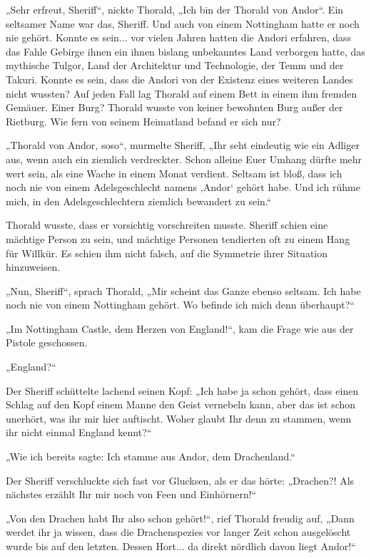 \documentclass[10pt, a4paper, oneside]{book}
\begin{document}
„Sehr erfreut, Sheriff“, nickte Thorald, „Ich bin der Thorald von Andor“. Ein seltsamer Name war das, Sheriff. Und auch von einem Nottingham hatte er noch nie gehört. Konnte es sein... vor vielen Jahren hatten die Andori erfahren, dass das Fahle Gebirge ihnen ein ihnen bislang unbekanntes Land verborgen hatte, das mythische Tulgor, Land der Architektur und Technologie, der Temm und der Takuri. Konnte es sein, dass die Andori von der Existenz eines weiteren Landes nicht wussten? Auf jeden Fall lag Thorald auf einem Bett in einem ihm fremden Gemäuer. Einer Burg? Thorald wusste von keiner bewohnten Burg außer der Rietburg. Wie fern von seinem Heimatland befand er sich nur?

„Thorald von Andor, soso“, murmelte Sheriff, „Ihr seht eindeutig wie ein Adliger aus, wenn auch ein ziemlich verdreckter. Schon alleine Euer Umhang dürfte mehr wert sein, als eine Wache in einem Monat verdient. Seltsam ist bloß, dass ich noch nie von einem Adelsgeschlecht namens ‚Andor‘ gehört habe. Und ich rühme mich, in den Adelsgeschlechtern ziemlich bewandert zu sein.“

Thorald wusste, dass er vorsichtig vorschreiten musste. Sheriff schien eine mächtige Person zu sein, und mächtige Personen tendierten oft zu einem Hang für Willkür. Es schien ihm nicht falsch, auf die Symmetrie ihrer Situation hinzuweisen.

„Nun, Sheriff“, sprach Thorald, „Mir scheint das Ganze ebenso seltsam. Ich habe noch nie von einem Nottingham gehört. Wo befinde ich mich denn überhaupt?“

„Im Nottingham Castle, dem Herzen von England!“, kam die Frage wie aus der Pistole geschossen.

„England?“

Der Sheriff schüttelte lachend seinen Kopf: „Ich habe ja schon gehört, dass einen Schlag auf den Kopf einem Manne den Geist vernebeln kann, aber das ist schon unerhört, was ihr mir hier auftischt. Woher glaubt Ihr denn zu stammen, wenn ihr nicht einmal England kennt?“

„Wie ich bereits sagte: Ich stamme aus Andor, dem Drachenland.“

Der Sheriff verschluckte sich fast vor Glucksen, als er das hörte: „Drachen?! Als nächstes erzählt Ihr mir noch von Feen und Einhörnern!“

„Von den Drachen habt Ihr also schon gehört!“, rief Thorald freudig auf, „Dann werdet ihr ja wissen, dass die Drachenspezies vor langer Zeit schon ausgelöscht wurde bis auf den letzten. Dessen Hort... da direkt nördlich davon liegt Andor!“
\end{document}
